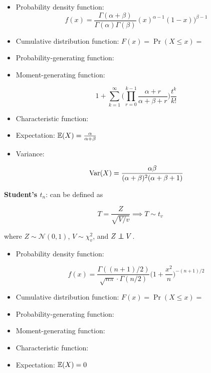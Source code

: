 \begin{itemize}
\begin{itemize}

\item Probability density function: 
\[
f(x)= \frac{\Gamma(\alpha + \beta)}{\Gamma(\alpha) \Gamma(\beta)} (x)^{\alpha-1}(1-x))^{\beta - 1}
\]

\item Cumulative distribution function: \(F(x) = \Pr(X \leq x) = \)

\item Probability-generating function:

\item Moment-generating function:

\[
1 + \sum_{k=1}^\infty \Bigg(  \prod_{r=0}^{k-1} \frac{\alpha +r}{\alpha + \beta + r}\Bigg) \frac{t^k}{k!}
\]

\item Characteristic function:

\item Expectation: \(\mathbb{E}(X) = \frac{\alpha}{\alpha + \beta} \)

\item Variance: 

\[
\mathrm{Var}(X) = \frac{\alpha \beta}{(\alpha + \beta)^2(\alpha + \beta + 1)} 
\]

\end{itemize}

\textbf{Student's \(t_n\)}: can be defined as

\[
T = \frac{Z}{\sqrt{V/v}} \implies T \sim t_v
\]

where \(Z \sim \mathcal{N}(0,1)\), \(V \sim \chi_v^2\), and \(Z \indep V\).

\begin{itemize}

\item Probability density function: 

\[
f(x)  = \frac{\Gamma((n+1)/2)}{\sqrt{n \pi} \cdot \Gamma(n/2)} \bigg( 1 + \frac{x^2}{n} \bigg)^{-(n+1)/2}
\]

\item Cumulative distribution function: \(F(x) = \Pr(X \leq x) = \)

\item Probability-generating function: 

\item Moment-generating function:

\item Characteristic function:

\item Expectation: \(\mathbb{E}(X) = 0  \)


\end{itemize}
\end{itemize}
